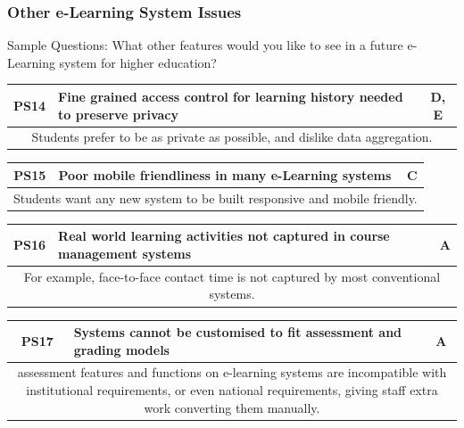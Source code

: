 \subsubsection{Other e-Learning System Issues}

Sample Questions: What other features would you like to see in a future e-Learning system for
higher education?

\begin{table}[!ht]
	\begin{tabularx}{\textwidth}{|c|X|c|}
		\hline
		PS14 & \textbf{Fine grained access control for learning history needed to preserve privacy} & D, E \\
		\hline
		\multicolumn{3}{|X|}{Students prefer to be as private as possible, and dislike data aggregation.}  \\
		\hline
	\end{tabularx}
\end{table}
\begin{table}[!ht]
	\begin{tabularx}{\textwidth}{|c|X|c|}
		\hline
		PS15 & \textbf{Poor mobile friendliness in many e-Learning systems} & C                        \\
		\hline
		\multicolumn{3}{|X|}{Students want any new system to be built responsive and mobile friendly.} \\
		\hline
	\end{tabularx}
\end{table}
\begin{table}[!ht]
	\begin{tabularx}{\textwidth}{|c|X|c|}
		\hline
		PS16 & \textbf{Real world learning activities not captured in course management systems} & A               \\
		\hline
		\multicolumn{3}{|X|}{For example, face-to-face contact time is not captured by most conventional systems.} \\
		\hline
	\end{tabularx}
\end{table}
\begin{table}[!ht]
	\begin{tabularx}{\textwidth}{|c|X|c|}
		\hline
		PS17 & \textbf{Systems cannot be customised to fit assessment and grading models} & A                              \\
		\hline
		\multicolumn{3}{|X|}{assessment features and functions on e-learning systems are incompatible
			with institutional requirements, or even national requirements, giving staff extra work converting them manually.} \\
		\hline
	\end{tabularx}
\end{table}
